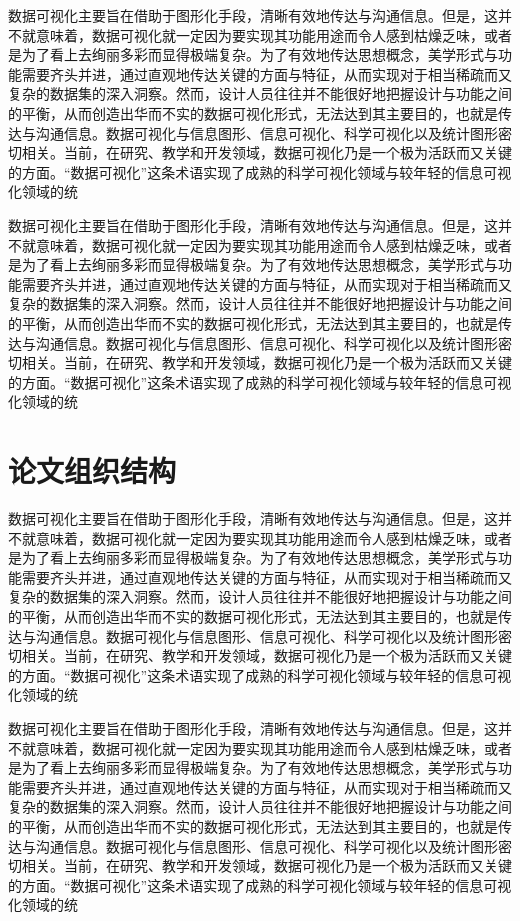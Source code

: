 		数据可视化主要旨在借助于图形化手段，清晰有效地传达与沟通信息。但是，这并不就意味着，数据可视化就一定因为要实现其功能用途而令人感到枯燥乏味，或者是为了看上去绚丽多彩而显得极端复杂。为了有效地传达思想概念，美学形式与功能需要齐头并进，通过直观地传达关键的方面与特征，从而实现对于相当稀疏而又复杂的数据集的深入洞察。然而，设计人员往往并不能很好地把握设计与功能之间的平衡，从而创造出华而不实的数据可视化形式，无法达到其主要目的，也就是传达与沟通信息。数据可视化与信息图形、信息可视化、科学可视化以及统计图形密切相关。当前，在研究、教学和开发领域，数据可视化乃是一个极为活跃而又关键的方面。“数据可视化”这条术语实现了成熟的科学可视化领域与较年轻的信息可视化领域的统
		
		数据可视化主要旨在借助于图形化手段，清晰有效地传达与沟通信息。但是，这并不就意味着，数据可视化就一定因为要实现其功能用途而令人感到枯燥乏味，或者是为了看上去绚丽多彩而显得极端复杂。为了有效地传达思想概念，美学形式与功能需要齐头并进，通过直观地传达关键的方面与特征，从而实现对于相当稀疏而又复杂的数据集的深入洞察。然而，设计人员往往并不能很好地把握设计与功能之间的平衡，从而创造出华而不实的数据可视化形式，无法达到其主要目的，也就是传达与沟通信息。数据可视化与信息图形、信息可视化、科学可视化以及统计图形密切相关。当前，在研究、教学和开发领域，数据可视化乃是一个极为活跃而又关键的方面。“数据可视化”这条术语实现了成熟的科学可视化领域与较年轻的信息可视化领域的统
	\section{论文组织结构}
	数据可视化主要旨在借助于图形化手段，清晰有效地传达与沟通信息。但是，这并不就意味着，数据可视化就一定因为要实现其功能用途而令人感到枯燥乏味，或者是为了看上去绚丽多彩而显得极端复杂。为了有效地传达思想概念，美学形式与功能需要齐头并进，通过直观地传达关键的方面与特征，从而实现对于相当稀疏而又复杂的数据集的深入洞察。然而，设计人员往往并不能很好地把握设计与功能之间的平衡，从而创造出华而不实的数据可视化形式，无法达到其主要目的，也就是传达与沟通信息。数据可视化与信息图形、信息可视化、科学可视化以及统计图形密切相关。当前，在研究、教学和开发领域，数据可视化乃是一个极为活跃而又关键的方面。“数据可视化”这条术语实现了成熟的科学可视化领域与较年轻的信息可视化领域的统
	
	数据可视化主要旨在借助于图形化手段，清晰有效地传达与沟通信息。但是，这并不就意味着，数据可视化就一定因为要实现其功能用途而令人感到枯燥乏味，或者是为了看上去绚丽多彩而显得极端复杂。为了有效地传达思想概念，美学形式与功能需要齐头并进，通过直观地传达关键的方面与特征，从而实现对于相当稀疏而又复杂的数据集的深入洞察。然而，设计人员往往并不能很好地把握设计与功能之间的平衡，从而创造出华而不实的数据可视化形式，无法达到其主要目的，也就是传达与沟通信息。数据可视化与信息图形、信息可视化、科学可视化以及统计图形密切相关。当前，在研究、教学和开发领域，数据可视化乃是一个极为活跃而又关键的方面。“数据可视化”这条术语实现了成熟的科学可视化领域与较年轻的信息可视化领域的统
	
